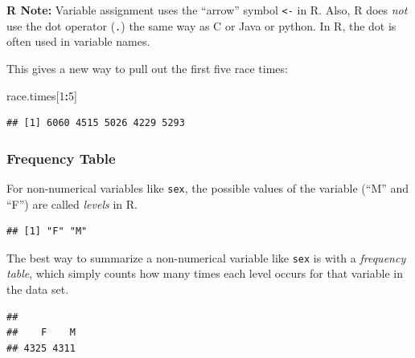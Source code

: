 \documentclass[
]{article}
\newenvironment{Shaded}{\begin{snugshade}}{\end{snugshade}}
\newcommand{\DecValTok}[1]{\textcolor[rgb]{0.00,0.00,0.81}{#1}}
\newcommand{\FunctionTok}[1]{\textcolor[rgb]{0.13,0.29,0.53}{\textbf{#1}}}
\newcommand{\NormalTok}[1]{#1}
\newcommand{\SpecialCharTok}[1]{\textcolor[rgb]{0.81,0.36,0.00}{\textbf{#1}}}
\begin{document}
\textbf{R Note:} Variable assignment uses the ``arrow'' symbol
\texttt{\textless{}-} in R. Also, R does \emph{not} use the dot operator
(\texttt{.}) the same way as C or Java or python. In R, the dot is often
used in variable names.

This gives a new way to pull out the first five race times:

\begin{Shaded}
\begin{Highlighting}[]
\NormalTok{race.times[}\DecValTok{1}\SpecialCharTok{:}\DecValTok{5}\NormalTok{]}
\end{Highlighting}
\end{Shaded}

\begin{verbatim}
## [1] 6060 4515 5026 4229 5293
\end{verbatim}

\subsubsection{Frequency Table}\label{frequency-table}

For non-numerical variables like \texttt{sex}, the possible values of
the variable (``M'' and ``F'') are called \emph{levels} in R.

\begin{Shaded}
\end{Shaded}

\begin{verbatim}
## [1] "F" "M"
\end{verbatim}

The best way to summarize a non-numerical variable like \texttt{sex} is
with a \emph{frequency table}, which simply counts how many times each
level occurs for that variable in the data set.

\begin{Shaded}
\end{Shaded}

\begin{verbatim}
## 
##    F    M 
## 4325 4311
\end{verbatim}
\end{document}

